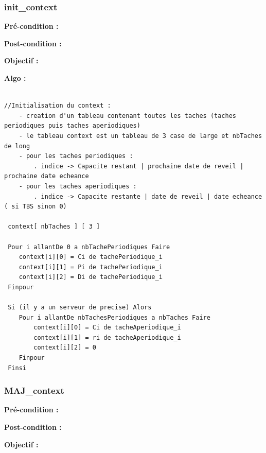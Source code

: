 			\subsubsection{init\_context}
				\textbf{Pré-condition :} 
				
				\textbf{Post-condition :} 
				
				\textbf{Objectif :} 
				
				\textbf{Algo :} 
					\begin{lstlisting}

//Initialisation du context : 
 	- creation d'un tableau contenant toutes les taches (taches periodiques puis taches aperiodiques)
 	- le tableau context est un tableau de 3 case de large et nbTaches de long
 	- pour les taches periodiques :
 		. indice -> Capacite restant | prochaine date de reveil | prochaine date echeance
 	- pour les taches aperiodiques : 
 		. indice -> Capacite restante | date de reveil | date echeance ( si TBS sinon 0)
 		 
 context[ nbTaches ] [ 3 ]
 
 Pour i allantDe 0 a nbTachePeriodiques Faire
 	context[i][0] = Ci de tachePeriodique_i
 	context[i][1] = Pi de tachePeriodique_i
 	context[i][2] = Di de tachePeriodique_i
 Finpour
 
 Si (il y a un serveur de precise) Alors
 	Pour i allantDe nbTachesPeriodiques a nbTaches Faire
 		context[i][0] = Ci de tacheAperiodique_i
 		context[i][1] = ri de tacheAperiodique_i
 		context[i][2] = 0 
 	Finpour
 Finsi
					\end{lstlisting}			
					
			\subsubsection{MAJ\_context}
				\textbf{Pré-condition :} 
				
				\textbf{Post-condition :} 
				
				\textbf{Objectif :} 
				
